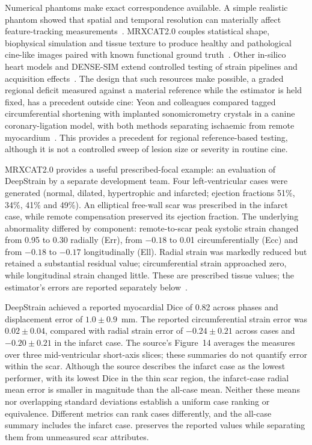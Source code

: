 Numerical phantoms make exact correspondence available. A simple realistic phantom showed that spatial and temporal resolution can materially affect feature-tracking measurements~\cite{adams2023}. MRXCAT2.0 couples statistical shape, biophysical simulation and tissue texture to produce healthy and pathological cine-like images paired with known functional ground truth~\cite{mrxcat2023}. Other in-silico heart models and DENSE-SIM extend controlled testing of strain pipelines and acquisition effects~\cite{mukherjee2024,barbaroux2025}. The design that such resources make possible, a graded regional deficit measured against a material reference while the estimator is held fixed, has a precedent outside cine: Yeon and colleagues compared tagged circumferential shortening with implanted sonomicrometry crystals in a canine coronary-ligation model, with both methods separating ischaemic from remote myocardium~\cite{yeon2001sonomicrometry}. This provides a precedent for regional reference-based testing, although it is not a controlled sweep of lesion size or severity in routine cine.

MRXCAT2.0 provides a useful prescribed-focal example: an evaluation of DeepStrain by a separate development team. Four left-ventricular cases were generated (normal, dilated, hypertrophic and infarcted; ejection fractions 51\%, 34\%, 41\% and 49\%). An elliptical free-wall scar was prescribed in the infarct case, while remote compensation preserved its ejection fraction. The underlying abnormality differed by component: remote-to-scar peak systolic strain changed from 0.95 to 0.30 radially (Err), from \(-0.18\) to 0.01 circumferentially (Ecc) and from \(-0.18\) to \(-0.17\) longitudinally (Ell). Radial strain was markedly reduced but retained a substantial residual value; circumferential strain approached zero, while longitudinal strain changed little. These are prescribed tissue values; the estimator's errors are reported separately below~\cite{mrxcat2023}.

DeepStrain achieved a reported myocardial Dice of 0.82 across phases and displacement error of \(1.0\pm0.9\)~mm. The reported circumferential strain error was \(0.02\pm0.04\), compared with radial strain error of \(-0.24\pm0.21\) across cases and \(-0.20\pm0.21\) in the infarct case. The source's Figure~14 averages the measures over three mid-ventricular short-axis slices; these summaries do not quantify error within the scar. Although the source describes the infarct case as the lowest performer, with its lowest Dice in the thin scar region, the infarct-case radial mean error is smaller in magnitude than the all-case mean. Neither these means nor overlapping standard deviations establish a uniform case ranking or equivalence. Different metrics can rank cases differently, and the all-case summary includes the infarct case.  preserves the reported values while separating them from unmeasured scar attributes.

